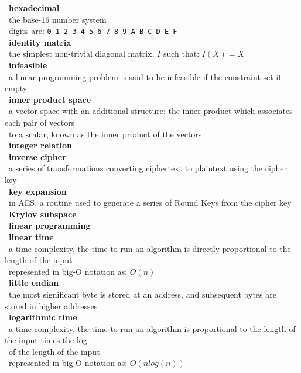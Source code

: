 \documentclass[10pt,letterpaper]{scrartcl}
\newcommand{\tbul}{\textbullet}
\newcommand{\tend}{\>\textendash}
\begin{document}
\begin{tabbing}
\begin{tabbing}
\tbul\ \textbf{hexadecimal} \\
    \tend\ the base-16 number system \\
    \tend\ digits are: \texttt{0 1 2 3 4 5 6 7 8 9 A B C D E F} \\
\tbul\ \textbf{identity matrix} \\
    \tend\ the simplest non-trivial diagonal matrix, $I$ such that: $I(X)=X$ \\
\tbul\ \textbf{infeasible} \\
    \tend\ a linear programming problem is said to be infeasible if the constraint set it empty \\
\tbul\ \textbf{inner product space} \\
    \tend\ a vector space with an additional structure: the inner product which associates each pair of vectors \\ \>\ to a scalar, known as the inner product of the vectors \\
\tbul\ \textbf{integer relation} \\
\tbul\ \textbf{inverse cipher} \\
    \tend\ a series of transformations converting ciphertext to plaintext using the cipher key \\
\tbul\ \textbf{key expansion} \\
    \tend\ in AES, a routine used to generate a series of Round Keys from the cipher key \\
\tbul\ \textbf{Krylov subspace} \\
\tbul\ \textbf{linear programming} \\ 
\tbul\ \textbf{linear time} \\
    \tend\ a time complexity, the time to run an algorithm is directly proportional to the length of the input \\
    \tend\ represented in big-O notation as: $O(n)$ \\
\tbul\ \textbf{little endian} \\
    \tend\ the most significant byte is stored at an address, and subsequent bytes are stored in higher addresses\\
\tbul\ \textbf{logarithmic time} \\
    \tend\ a time complexity, the time to run an algorithm is proportional to the length of the input times the log \\ \>\ of the length of the input \\
    \tend\ represented in big-O notation as: $O(nlog(n))$ \\

\end{tabbing}
\end{tabbing}
\end{document}
